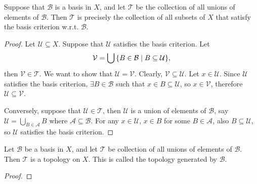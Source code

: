 \begin{lm}
    Suppose that $\mathcal B$ is a basis in $X$, and let $\mathcal T$ be the collection of all unions of elements of $\mathcal B$. Then $\mathcal T$ is precisely the collection of all subsets of $X$ that satisfy the basis criterion w.r.t. $\mathcal B$.
    \begin{proof}
        Let $\mathcal U\subseteq X$. Suppose that $\mathcal U$ satisfies the basis criterion. Let
        \[
        \mathcal V = \bigcup{\left\{{B\in\mathcal B\mid B\subseteq\mathcal U}\right\}},
        \]
        then $\mathcal V \in \mathcal T$. We want to show that $\mathcal U = \mathcal V$. Clearly, $\mathcal V\subseteq \mathcal U$. Let $x\in \mathcal U$. Since $\mathcal U$ satisfies the basis criterion, $\exists B\in\mathcal B$ such that $x\in B\subseteq \mathcal U$, so $x\in \mathcal V$, therefore $\mathcal U\subseteq \mathcal V$.

        Conversely, suppose that $\mathcal U\in \mathcal T$, then $\mathcal U$ is a union of elements of $\mathcal B$, say $\mathcal U = \bigcup_{B\in\mathcal A}B$ where $\mathcal A\subseteq \mathcal B$. For any $x\in\mathcal U$, $x\in B$ for some $B\in \mathcal A$, also $B\subseteq \mathcal U$, so $\mathcal U$ satisfies the basis criterion.
    \end{proof}
\end{lm}

\begin{prop}
    Let $\mathcal B$ be a basis in $X$, and let $\mathcal T$ be collection of all unions of elements of $\mathcal B$. Then $\mathcal T$ is a topology on $X$. This is called the topology generated by $\mathcal B$.
    \begin{proof}
    \end{proof}
\end{prop}